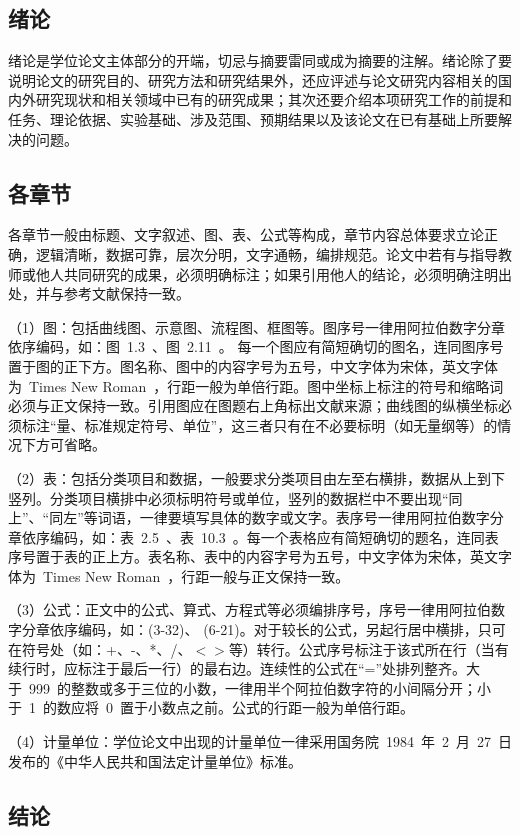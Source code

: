\subsection{绪论}

绪论是学位论文主体部分的开端，切忌与摘要雷同或成为摘要的注解。绪论除了要说明论文的研究目的、研究方法和研究结果外，还应评述与论文研究内容相关的国内外研究现状和相关领域中已有的研究成果；其次还要介绍本项研究工作的前提和任务、理论依据、实验基础、涉及范围、预期结果以及该论文在已有基础上所要解决的问题。

\subsection{各章节}

各章节一般由标题、文字叙述、图、表、公式等构成，章节内容总体要求立论正确，逻辑清晰，数据可靠，层次分明，文字通畅，编排规范。论文中若有与指导教师或他人共同研究的成果，必须明确标注；如果引用他人的结论，必须明确注明出处，并与参考文献保持一致。

（1）图：包括曲线图、示意图、流程图、框图等。图序号一律用阿拉伯数字分章依序编码，如：图~1.3~、图~2.11~。 每一个图应有简短确切的图名，连同图序号置于图的正下方。图名称、图中的内容字号为五号，中文字体为宋体，英文字体为~Times New Roman~，行距一般为单倍行距。图中坐标上标注的符号和缩略词必须与正文保持一致。引用图应在图题右上角标出文献来源；曲线图的纵横坐标必须标注“量、标准规定符号、单位”，这三者只有在不必要标明（如无量纲等）的情况下方可省略。

（2）表：包括分类项目和数据，一般要求分类项目由左至右横排，数据从上到下竖列。分类项目横排中必须标明符号或单位，竖列的数据栏中不要出现“同上”、“同左”等词语，一律要填写具体的数字或文字。表序号一律用阿拉伯数字分章依序编码，如：表~2.5~、表~10.3~。每一个表格应有简短确切的题名，连同表序号置于表的正上方。表名称、表中的内容字号为五号，中文字体为宋体，英文字体为~Times New Roman~，行距一般与正文保持一致。

（3）公式：正文中的公式、算式、方程式等必须编排序号，序号一律用阿拉伯数字分章依序编码，如：(3-32)、 (6-21)。对于较长的公式，另起行居中横排，只可在符号处（如：+、-、*、/、$<$$>$等）转行。公式序号标注于该式所在行（当有续行时，应标注于最后一行）的最右边。连续性的公式在“=”处排列整齐。大于~999~的整数或多于三位的小数，一律用半个阿拉伯数字符的小间隔分开；小于~1~的数应将~0~置于小数点之前。公式的行距一般为单倍行距。

（4）计量单位：学位论文中出现的计量单位一律采用国务院~1984~年~2~月~27~日发布的《中华人民共和国法定计量单位》标准。

\subsection{结论}

